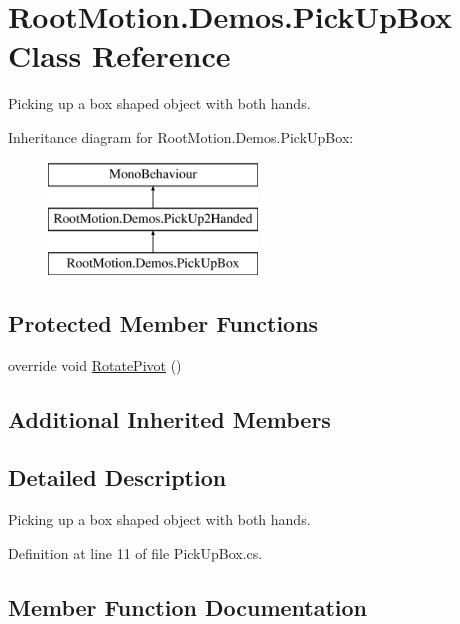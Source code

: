 \hypertarget{class_root_motion_1_1_demos_1_1_pick_up_box}{}\section{Root\+Motion.\+Demos.\+Pick\+Up\+Box Class Reference}
\label{class_root_motion_1_1_demos_1_1_pick_up_box}


Picking up a box shaped object with both hands.  


Inheritance diagram for Root\+Motion.\+Demos.\+Pick\+Up\+Box\+:\begin{figure}[H]
\begin{center}
\leavevmode
\includegraphics[height=3.000000cm]{class_root_motion_1_1_demos_1_1_pick_up_box}
\end{center}
\end{figure}
\subsection*{Protected Member Functions}
\begin{DoxyCompactItemize}
\item 
override void \mbox{\hyperlink{class_root_motion_1_1_demos_1_1_pick_up_box_a0533d1ab1f95c6a422316b9610759856}{Rotate\+Pivot}} ()
\end{DoxyCompactItemize}
\subsection*{Additional Inherited Members}


\subsection{Detailed Description}
Picking up a box shaped object with both hands. 



Definition at line 11 of file Pick\+Up\+Box.\+cs.



\subsection{Member Function Documentation}
\mbox{\label{class_root_motion_1_1_demos_1_1_pick_up_box_a0533d1ab1f95c6a422316b9610759856}} 
